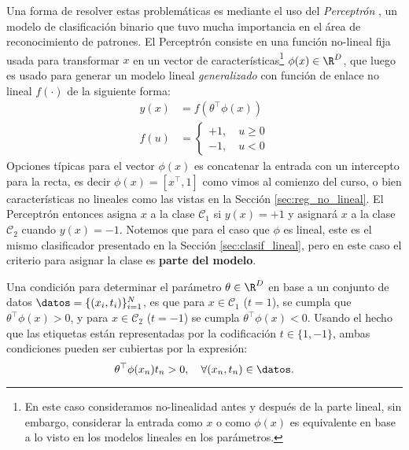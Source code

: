 Una forma de resolver estas problemáticas es mediante el uso del \emph{Perceptrón} \cite{rosenblatt_1958}, un modelo de clasificación binario que tuvo mucha importancia en el área de reconocimiento de patrones. El Perceptrón consiste en una función no-lineal fija usada para transformar $x$ en un vector de características\footnote{En este caso consideramos no-linealidad antes y después de la parte lineal, sin embargo, considerar la entrada como $x$ o  como $\phi(x)$ es  equivalente en base a lo  visto en los modelos lineales en los parámetros. } $\phi(x)\in\R^D$, que luego es usado para generar un modelo lineal \emph{generalizado} con función de enlace no lineal $f(\cdot)$ de la siguiente forma:
\begin{align}
	y(x) &= f(\theta^\top\phi(x))\\
	f(u) &= \left\{\begin{matrix}
	+1,\quad u\geq 0\\
	-1,\quad u<0
	\end{matrix}\right.
\end{align}
Opciones típicas para el vector $\phi(x)$ es concatenar la entrada con un intercepto para la recta, es decir $\phi(x) = [x^\top, 1]$ como vimos al comienzo del curso, o bien características no lineales como las vistas en la Sección \ref{sec:reg_no_lineal}. El Perceptrón entonces asigna $x$ a la clase $\mathcal{C}_1$ si $y(x)=+1$ y asignará $x$ a la clase $\mathcal{C}_2$ cuando $y(x)=-1$. Notemos que  para  el caso que $\phi$ es lineal, este es el mismo clasificador presentado en la Sección \ref{sec:clasif_lineal}, pero en este caso el criterio para asignar la clase es \textbf{parte del modelo}.

Una condición para determinar el parámetro $\theta\in\R^D$ en base a un conjunto de datos  $\datos = \{(x_i,t_i)\}_{i=1}^N$, es que para $x\in\mathcal{C}_1$ ($t=1$), se cumpla que $\theta^\top\phi(x) > 0$, y para $x\in\mathcal{C}_2$ ($t=-1$) se cumpla $\theta^\top \phi(x) < 0$. Usando el hecho que las etiquetas están representadas por la  codificación $t\in\{1,-1\}$, ambas condiciones pueden ser cubiertas por la expresión:
\begin{equation}
	\theta^\top\phi(x_n)t_n > 0,\quad \forall (x_n,t_n) \in \datos.
\end{equation}

